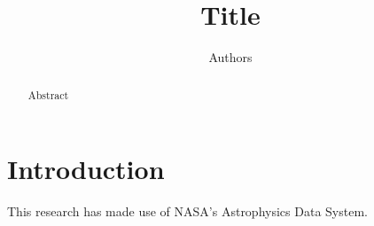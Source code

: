 \documentclass{aastex61}
\begin{document}
\title{Title}

\correspondingauthor{}

\author{Authors}
 
\begin{abstract}
Abstract
\end{abstract}

\keywords{}

\section{Introduction} 

\acknowledgments

This research has made use of NASA's Astrophysics Data System.

\begin{thebibliography}{}
\end{thebibliography}
\end{document}
